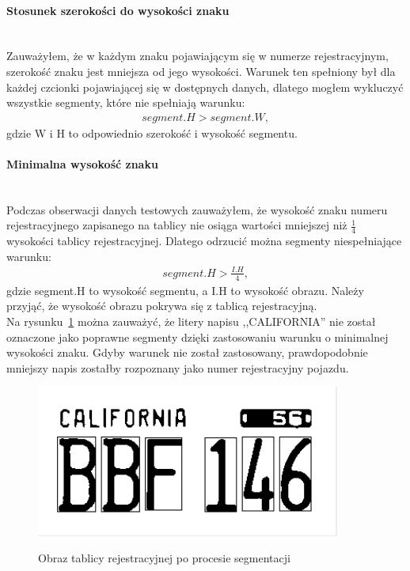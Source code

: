 \paragraph{Stosunek szerokości do wysokości znaku}\mbox{}\\
Zauważyłem, że w każdym znaku pojawiającym się w numerze rejestracyjnym, szerokość znaku jest mniejsza od jego wysokości. Warunek ten spełniony był dla każdej czcionki pojawiającej się w dostępnych danych, dlatego mogłem wykluczyć wszystkie segmenty, które nie spełniają warunku:
\begin{gather*}
  segment.H > segment.W,
\end{gather*}
gdzie W i H to odpowiednio szerokość i wysokość segmentu.

\paragraph{Minimalna wysokość znaku}\mbox{}\\
Podczas obserwacji danych testowych zauważyłem, że wysokość znaku numeru rejestracyjnego zapisanego na tablicy nie osiąga wartości mniejszej niż $\frac{1}{4}$ wysokości tablicy rejestracyjnej. Dlatego odrzucić można segmenty niespełniające warunku:
\begin{gather*}
  segment.H > \frac{I.H}{4},
\end{gather*}
gdzie segment.H to wysokość segmentu, a I.H to wysokość obrazu. Należy przyjąć, że wysokość obrazu pokrywa się z tablicą rejestracyjną.\\
Na rysunku~\ref{fig:min_height_condition} można zauważyć, że litery napisu ,,CALIFORNIA'' nie został oznaczone jako poprawne segmenty dzięki zastosowaniu warunku o minimalnej wysokości znaku. Gdyby warunek nie został zastosowany, prawdopodobnie mniejszy napis zostałby rozpoznany jako numer rejestracyjny pojazdu.

\begin{figure}
  \centering
  \includegraphics[width=10cm]{img/min-height-condition-output}
  \label{fig:detect_bg_bad_input}
  \caption{Obraz tablicy rejestracyjnej po procesie segmentacji}
  \label{fig:min_height_condition}
\end{figure}

